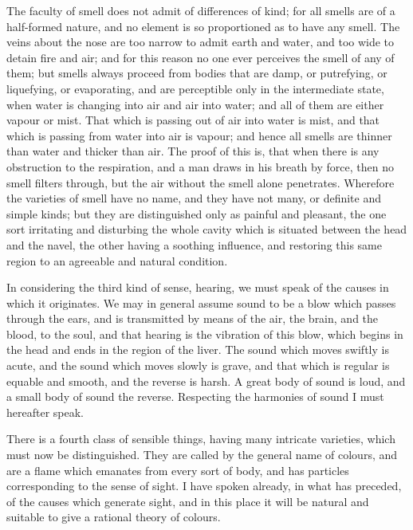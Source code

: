 The faculty of smell does not admit of differences of kind; for all smells
are of a half-formed nature, and no element is so proportioned as to have
any smell. The veins about the nose are too narrow to admit earth and
water, and too wide to detain fire and air; and for this reason no one
ever perceives the smell of any of them; but smells always proceed from
bodies that are damp, or putrefying, or liquefying, or evaporating, and
are perceptible only in the intermediate state, when water is changing
into air and air into water; and all of them are either vapour or mist.
That which is passing out of air into water is mist, and that which is
passing from water into air is vapour; and hence all smells are thinner
than water and thicker than air. The proof of this is, that when there is
any obstruction to the respiration, and a man draws in his breath by
force, then no smell filters through, but the air without the smell alone
penetrates. Wherefore the varieties of smell have no name, and they have
not many, or definite and simple kinds; but they are distinguished only as
painful and pleasant, the one sort irritating and disturbing the whole
cavity which is situated between the head and the navel, the other having
a soothing influence, and restoring this same region to an agreeable and
natural condition.

In considering the third kind of sense, hearing, we must speak of the
causes in which it originates. We may in general assume sound to be a blow
which passes through the ears, and is transmitted by means of the air, the
brain, and the blood, to the soul, and that hearing is the vibration of
this blow, which begins in the head and ends in the region of the liver.
The sound which moves swiftly is acute, and the sound which moves slowly
is grave, and that which is regular is equable and smooth, and the reverse
is harsh. A great body of sound is loud, and a small body of sound the
reverse. Respecting the harmonies of sound I must hereafter speak.

There is a fourth class of sensible things, having many intricate
varieties, which must now be distinguished. They are called by the general
name of colours, and are a flame which emanates from every sort of body,
and has particles corresponding to the sense of sight. I have spoken
already, in what has preceded, of the causes which generate sight, and in
this place it will be natural and suitable to give a rational theory of
colours.

